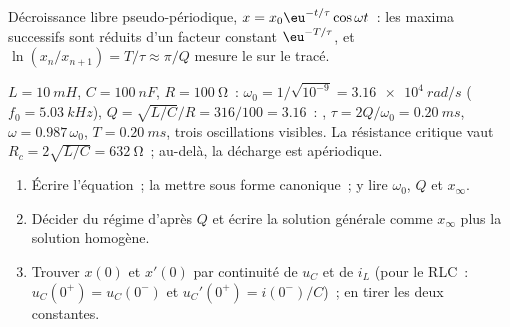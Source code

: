 \begin{omfigure}

{\small Décroissance libre pseudo-périodique,
$x = x_0\eu^{-t/\tau}\cos\omega t$~: les maxima successifs sont réduits
d'un facteur constant $\eu^{-T/\tau}$, et
$\ln(x_n/x_{n+1}) = T/\tau \approx \pi/Q$ mesure le 
sur le tracé.}
\end{omfigure}

\begin{example}\label{ex:b1:transient-regimes:rlcnum}
$L = \qty{10}{mH}$, $C = \qty{100}{nF}$, $R = \qty{100}{\ohm}$~:
$\omega_0 = 1/\sqrt{10^{-9}} = \qty{3.16e4}{rad/s}$ ($f_0 =
\qty{5.03}{kHz}$), $Q = \sqrt{L/C}/R = 316/100 = 3.16$~: , $\tau = 2Q/\omega_0 = \qty{0.20}{ms}$,
$\omega = 0.987\,\omega_0$, $T = \qty{0.20}{ms}$, trois oscillations
visibles. La résistance critique vaut $R_c = 2\sqrt{L/C} = \qty{632}{\ohm}$~;
au-delà, la décharge est apériodique.
\end{example}

\begin{method}\label{met:b1:transient-regimes:second}
\begin{enumerate}
  \item Écrire l'équation~; la mettre sous forme canonique~; y lire
        $\omega_0$, $Q$ et $x_\infty$.
  \item Décider du régime d'après $Q$ et écrire la solution générale
        comme $x_\infty$ plus la solution homogène.
  \item Trouver $x(0)$ et $x'(0)$ par continuité de $u_C$ et de $i_L$
        (pour le RLC~: $u_C(0^+) = u_C(0^-)$ et $u_C'(0^+) = i(0^-)/C$)~;
        en tirer les deux constantes.
\end{enumerate}
\end{method}

